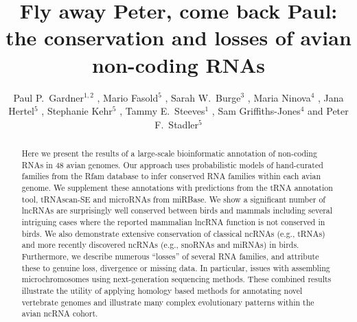 \documentclass[10pt]{bmc_article}
\newenvironment{bmcformat}{\begin{raggedright}\baselineskip20pt\sloppy\setboolean{publ}{false}}{\end{raggedright}\baselineskip20pt\sloppy}
\begin{document}
\begin{bmcformat}

\title{Fly away Peter, come back Paul: the conservation and losses of avian non-coding RNAs}

\author{
Paul P.\ Gardner\correspondingauthor$^{1,2}$
,
Mario Fasold$^5$
,
Sarah W.\ Burge$^3$
,
Maria Ninova$^4$
,
Jana Hertel$^5$
,
Stephanie Kehr$^5$
,
Tammy E.\ Steeves$^1$
,
Sam Griffiths-Jones$^4$
and
Peter F.\ Stadler\correspondingauthor$^5$
}
\address{
\iid(1) School of Biological Sciences, University of Canterbury, Private Bag 4800, Christchurch, New Zealand.
\iid(2) Biomolecular Interaction Centre, University of Canterbury, Private Bag 4800, Christchurch, New Zealand.
\iid(3) European Molecular Biology Laboratory, European Bioinformatics Institute, Hinxton, Cambridge, CB10 1SD, UK.
\iid(4) Faculty of Life Sciences, University of Manchester, Manchester, United Kingdom.
\iid(5) Bioinformatics Group, Department of Computer Science; and Interdisciplinary Center for Bioinformatics, University of Leipzig, H{\"a}rtelstrasse 16-18, D-04107 Leipzig, Germany
}

\maketitle

\begin{abstract}
Here we present the results of a large-scale bioinformatic annotation
of non-coding RNAs in 48 avian genomes. Our approach uses
probabilistic models of hand-curated families from the Rfam database
to infer conserved RNA families within each avian genome. We
supplement these annotations with predictions from the tRNA annotation
tool, tRNAscan-SE and microRNAs from miRBase.  We show a significant
number of lncRNAs are surprisingly well conserved between birds and
mammals including several intriguing cases where the reported
mammalian lncRNA function is not conserved in birds.  We also
demonstrate extensive conservation of classical ncRNAs (e.g., tRNAs)
and more recently discovered ncRNAs (e.g., snoRNAs and miRNAs) in
birds. Furthermore, we describe numerous ``losses'' of several RNA
families, and attribute these to genuine loss, divergence or missing
data.  In particular, issues with assembling microchromosomes using
next-generation sequencing methods. These combined results illustrate
the utility of applying homology based methods for annotating novel
vertebrate genomes and illustrate many complex evolutionary patterns
within the avian ncRNA cohort.
\end{abstract}


\end{bmcformat}
\end{document}

